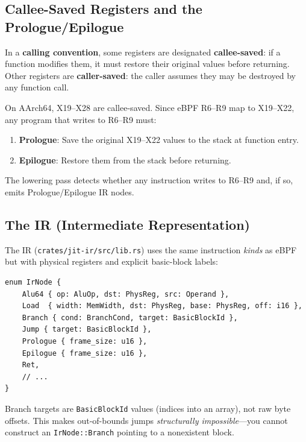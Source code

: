 \documentclass[11pt,letterpaper]{article}
\begin{document}
\subsection{Callee-Saved Registers and the Prologue/Epilogue}

\begin{definition}
In a \textbf{calling convention}, some registers are designated \textbf{callee-saved}: if a function modifies them, it must restore their original values before returning. Other registers are \textbf{caller-saved}: the caller assumes they may be destroyed by any function call.
\end{definition}

On AArch64, X19--X28 are callee-saved. Since eBPF R6--R9 map to X19--X22, any program that writes to R6--R9 must:
\begin{enumerate}
    \item \textbf{Prologue}: Save the original X19--X22 values to the stack at function entry.
    \item \textbf{Epilogue}: Restore them from the stack before returning.
\end{enumerate}

The lowering pass detects whether any instruction writes to R6--R9 and, if so, emits Prologue/Epilogue IR nodes.

\subsection{The IR (Intermediate Representation)}

The IR (\texttt{crates/jit-ir/src/lib.rs}) uses the same instruction \emph{kinds} as eBPF but with physical registers and explicit basic-block labels:

\begin{lstlisting}[style=rust]
enum IrNode {
    Alu64 { op: AluOp, dst: PhysReg, src: Operand },
    Load  { width: MemWidth, dst: PhysReg, base: PhysReg, off: i16 },
    Branch { cond: BranchCond, target: BasicBlockId },
    Jump { target: BasicBlockId },
    Prologue { frame_size: u16 },
    Epilogue { frame_size: u16 },
    Ret,
    // ...
}
\end{lstlisting}

Branch targets are \texttt{BasicBlockId} values (indices into an array), not raw byte offsets. This makes out-of-bounds jumps \emph{structurally impossible}---you cannot construct an \texttt{IrNode::Branch} pointing to a nonexistent block.

\end{document}
